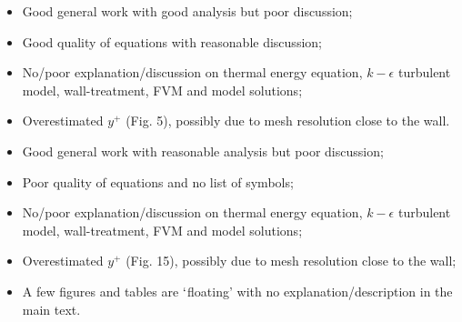 \documentclass[14pt,twoside]{report}
\newcommand\blankpage{%
    \null
    \thispagestyle{empty}%
    \addtocounter{page}{-1}%
    \newpage}
\begin{document}
\bigskip


\medskip

  \begin{itemize}
%
     \item Good general work with good analysis but poor discussion;
     \item Good quality of equations with reasonable discussion;
     \item No/poor explanation/discussion on thermal energy equation, $k-\epsilon$ turbulent model, wall-treatment, FVM and model solutions;
     \item Overestimated $y^{+}$ (Fig. 5), possibly due to mesh resolution close to the wall.
%
  \end{itemize}%

\clearpage 





\bigskip


\medskip

  \begin{itemize}
%
     \item Good general work with reasonable analysis but poor discussion;
     \item Poor quality of equations and no list of symbols;
     \item No/poor explanation/discussion on thermal energy equation, $k-\epsilon$ turbulent model, wall-treatment, FVM and model solutions;
     \item Overestimated $y^{+}$ (Fig. 15), possibly due to mesh resolution close to the wall;
     \item A few figures and tables are $\lq$floating' with no explanation/description in the main text.
%
  \end{itemize}%

\clearpage 






\bigskip

\end{document}

